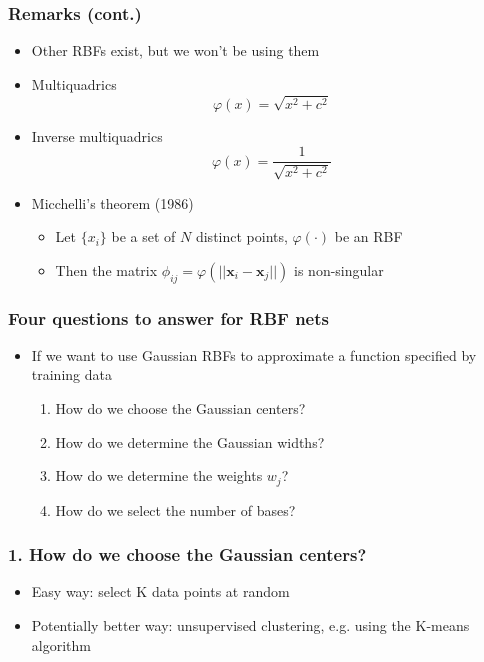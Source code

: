 \documentclass[12pt,notes,mathserif]{beamer}
\providecommand{\tightlist}{%
  \setlength{\itemsep}{0pt}\setlength{\parskip}{0pt}}
\begin{document}
\begin{frame}[c]
	\frametitle{Remarks (cont.)}
	\begin{itemize}
		\item Other RBFs exist, but we won't be using them
		\item Multiquadrics
		      \[
			      \varphi(x)=\sqrt{x^2+c^2}
		      \]
		\item Inverse multiquadrics
		      \[
			      \varphi(x)=\frac{1}{\sqrt{x^2+c^2}}
		      \]
		\item Micchelli's theorem (1986)
		      \begin{itemize}
			      \item Let $\{x_i\}$ be a set of $N$ distinct points, $\varphi(\cdot)$ be an RBF
			      \item Then the matrix $\phi_{ij}=\varphi(||\mathbf{x}_i-\mathbf{x}_j||)$ is non-singular
		      \end{itemize}
	\end{itemize}
\end{frame}

\begin{frame}[c]
	\frametitle{Four questions to answer for RBF nets}
	\begin{itemize}
		\item If we want to use Gaussian RBFs to approximate a function specified by training data
		      \begin{enumerate}
			      \item How do we choose the Gaussian centers?
			      \item How do we determine the Gaussian widths?
			      \item How do we determine the weights $w_j$?
			      \item How do we select the number of bases?
		      \end{enumerate}
	\end{itemize}
\end{frame}


\begin{frame}[c]
	\frametitle{1. How do we choose the Gaussian centers?}
	\begin{itemize}
		\tightlist
		\item Easy way: select K data points at random
		\item Potentially better way: unsupervised clustering, e.g. using the K-means algorithm
	\end{itemize}
\end{frame}
\end{document}
